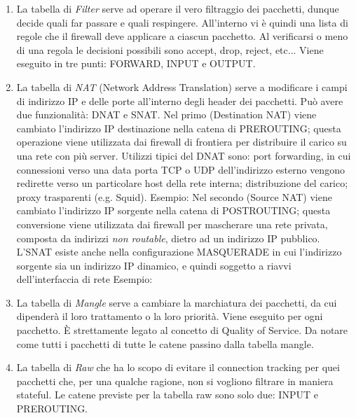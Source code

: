 \begin{enumerate}
\item La tabella di \textit{Filter} serve ad operare il vero filtraggio dei pacchetti, dunque decide quali far passare e quali respingere. All'interno vi è quindi una lista di regole che il firewall deve applicare a ciascun pacchetto. Al verificarsi o meno di una regola le decisioni possibili sono accept, drop, reject, etc...
Viene eseguito in tre punti: FORWARD, INPUT e OUTPUT.

\item La tabella di \textit{NAT} (Network Address Translation) serve a modificare i campi di indirizzo IP  e delle porte all'interno degli header dei pacchetti. Può avere due funzionalità: DNAT e SNAT. Nel primo (Destination NAT) viene cambiato l'indirizzo IP destinazione nella catena di PREROUTING; questa operazione viene utilizzata dai firewall di frontiera per distribuire il carico su una rete con più server. Utilizzi tipici del DNAT sono: port forwarding, in cui connessioni verso una data porta TCP o UDP dell'indirizzo esterno vengono redirette verso un particolare host della rete interna; distribuzione del carico; proxy trasparenti (e.g. Squid). Esempio:
Nel secondo (Source NAT) viene cambiato l'indirizzo IP sorgente nella catena di POSTROUTING; questa conversione viene utilizzata dai firewall per mascherare una rete privata, composta da indirizzi \textit{non routable}, dietro ad un indirizzo IP pubblico. L'SNAT esiste anche nella configurazione MASQUERADE in cui l'indirizzo sorgente sia un indirizzo IP dinamico, e quindi soggetto a riavvi dell'interfaccia di rete Esempio:

\item La tabella di \textit{Mangle} serve a cambiare la marchiatura dei pacchetti, da cui dipenderà il loro trattamento o la loro priorità. Viene eseguito per ogni pacchetto. È strettamente legato al concetto di Quality of Service. Da notare come tutti i pacchetti di tutte le catene passino dalla tabella mangle.

\item La tabella di \textit{Raw} che ha lo scopo di evitare il connection tracking per quei pacchetti che, per una qualche ragione, non si vogliono filtrare in maniera stateful. Le catene previste per la tabella raw sono solo due: INPUT e PREROUTING.
 

\end{enumerate}
